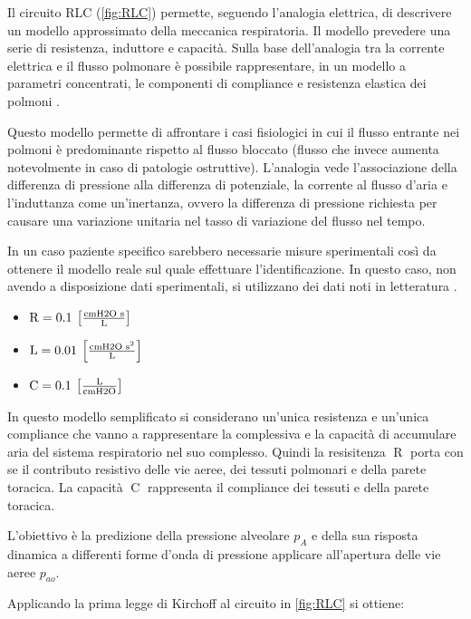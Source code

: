 Il circuito RLC (\cref{fig:RLC}) permette, seguendo l'analogia elettrica, di descrivere un modello approssimato della meccanica respiratoria. Il modello prevedere una serie di resistenza, induttore e capacità. Sulla base dell'analogia tra la corrente elettrica e il flusso polmonare è possibile rappresentare, in un modello a parametri concentrati, le componenti di compliance e resistenza elastica dei polmoni \cite{ghafarian_review_nodate}. 

Questo modello permette di affrontare i casi fisiologici in cui il flusso entrante nei polmoni è predominante rispetto al flusso bloccato (flusso che invece aumenta notevolmente in caso di patologie ostruttive). L'analogia vede l'associazione della differenza di pressione alla differenza di potenziale, la corrente al flusso d'aria e l'induttanza come un'inertanza, ovvero la differenza di pressione richiesta per causare una variazione unitaria nel tasso di variazione del flusso nel tempo. 

In un caso paziente specifico sarebbero necessarie misure sperimentali così da ottenere il modello reale sul quale effettuare l'identificazione. In questo caso, non avendo a disposizione dati sperimentali, si utilizzano dei dati noti in letteratura \cite{khoo_physiological_2018}. 

\begin{itemize}
	\item $\operatorname{R}=0.1  \:\left[\text{cmH2O s}\over \text{L} \right]$
	\item $\operatorname{L}=0.01 \:\left[\text{cmH2O s}^2\over \text{L} \right]$
	\item $\operatorname{C}=0.1 \:\left[\text{L}\over \text{cmH2O} \right]$
\end{itemize}

In questo modello semplificato si considerano un'unica resistenza e un'unica compliance che vanno a rappresentare la complessiva e la capacità di accumulare aria del sistema respiratorio nel suo complesso. Quindi la resisitenza $\operatorname{R}$ porta con se il contributo resistivo delle vie aeree, dei tessuti polmonari e della parete toracica. La capacità $\operatorname{C}$ rappresenta il compliance dei tessuti e della parete toracica.

L'obiettivo è la predizione della pressione alveolare $p_A$ e della sua risposta dinamica a differenti forme d'onda di pressione applicare all'apertura delle vie aeree $p_{ao}$.

Applicando la prima legge di Kirchoff al circuito in \cref{fig:RLC} si ottiene:


